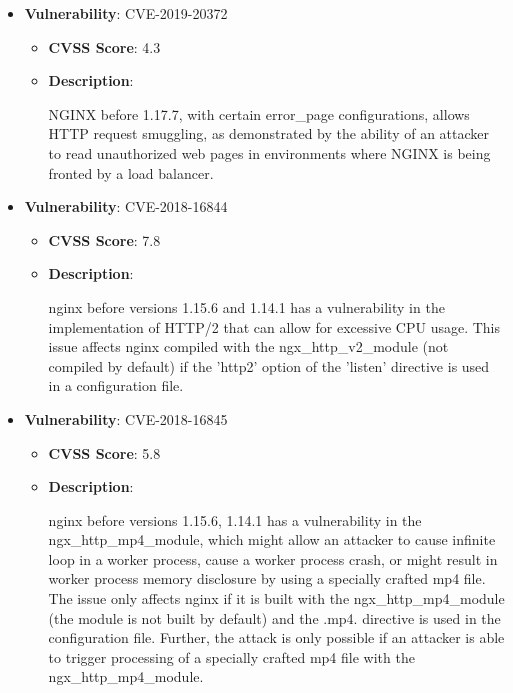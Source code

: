 \documentclass{article}
\begin{document}
\begin{itemize}
        \item \textbf{Vulnerability}: CVE-2019-20372
        \begin{itemize}
            \item \textbf{CVSS Score}:  4.3 
            \item \textbf{Description}:
            \parbox[t]{0.9\linewidth}{
                \ttfamily NGINX before 1.17.7, with certain error\_page configurations, allows HTTP request smuggling, as demonstrated by the ability of an attacker to read unauthorized web pages in environments where NGINX is being fronted by a load balancer.
            }
        \end{itemize}
    
        \item \textbf{Vulnerability}: CVE-2018-16844
        \begin{itemize}
            \item \textbf{CVSS Score}:  7.8 
            \item \textbf{Description}:
            \parbox[t]{0.9\linewidth}{
                \ttfamily nginx before versions 1.15.6 and 1.14.1 has a vulnerability in the implementation of HTTP/2 that can allow for excessive CPU usage. This issue affects nginx compiled with the ngx\_http\_v2\_module (not compiled by default) if the 'http2' option of the 'listen' directive is used in a configuration file.
            }
        \end{itemize}
    
        \item \textbf{Vulnerability}: CVE-2018-16845
        \begin{itemize}
            \item \textbf{CVSS Score}:  5.8 
            \item \textbf{Description}:
            \parbox[t]{0.9\linewidth}{
                \ttfamily nginx before versions 1.15.6, 1.14.1 has a vulnerability in the ngx\_http\_mp4\_module, which might allow an attacker to cause infinite loop in a worker process, cause a worker process crash, or might result in worker process memory disclosure by using a specially crafted mp4 file. The issue only affects nginx if it is built with the ngx\_http\_mp4\_module (the module is not built by default) and the .mp4. directive is used in the configuration file. Further, the attack is only possible if an attacker is able to trigger processing of a specially crafted mp4 file with the ngx\_http\_mp4\_module.
            }
        \end{itemize}
    

\end{itemize}
\end{document}

